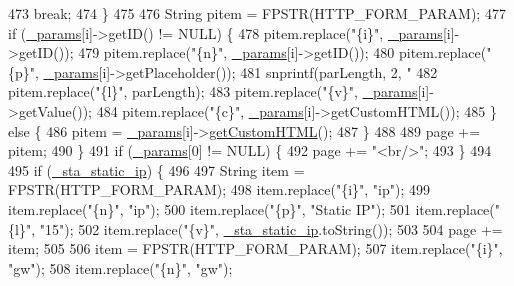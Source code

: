\begin{DoxyCode}
473       \textcolor{keywordflow}{break};
474     \}
475 
476     String pitem = FPSTR(HTTP\_FORM\_PARAM);
477     \textcolor{keywordflow}{if} (\hyperlink{class_wi_fi_manager_a355ce9bbaab94baffd1c83de9b166fea}{\_params}[i]->getID() != NULL) \{
478       pitem.replace(\textcolor{stringliteral}{"\{i\}"}, \hyperlink{class_wi_fi_manager_a355ce9bbaab94baffd1c83de9b166fea}{\_params}[i]->getID());
479       pitem.replace(\textcolor{stringliteral}{"\{n\}"}, \hyperlink{class_wi_fi_manager_a355ce9bbaab94baffd1c83de9b166fea}{\_params}[i]->getID());
480       pitem.replace(\textcolor{stringliteral}{"\{p\}"}, \hyperlink{class_wi_fi_manager_a355ce9bbaab94baffd1c83de9b166fea}{\_params}[i]->getPlaceholder());
481       snprintf(parLength, 2, \textcolor{stringliteral}{"%
482       pitem.replace(\textcolor{stringliteral}{"\{l\}"}, parLength);
483       pitem.replace(\textcolor{stringliteral}{"\{v\}"}, \hyperlink{class_wi_fi_manager_a355ce9bbaab94baffd1c83de9b166fea}{\_params}[i]->getValue());
484       pitem.replace(\textcolor{stringliteral}{"\{c\}"}, \hyperlink{class_wi_fi_manager_a355ce9bbaab94baffd1c83de9b166fea}{\_params}[i]->getCustomHTML());
485     \} \textcolor{keywordflow}{else} \{
486       pitem = \hyperlink{class_wi_fi_manager_a355ce9bbaab94baffd1c83de9b166fea}{\_params}[i]->\hyperlink{class_wi_fi_manager_parameter_a596273c189eb40107500cee3ad31b13b}{getCustomHTML}();
487     \}
488 
489     page += pitem;
490   \}
491   \textcolor{keywordflow}{if} (\hyperlink{class_wi_fi_manager_a355ce9bbaab94baffd1c83de9b166fea}{\_params}[0] != NULL) \{
492     page += \textcolor{stringliteral}{"<br/>"};
493   \}
494 
495   \textcolor{keywordflow}{if} (\hyperlink{class_wi_fi_manager_ad90d356096742a43b4540117b92faff0}{\_sta\_static\_ip}) \{
496 
497     String item = FPSTR(HTTP\_FORM\_PARAM);
498     item.replace(\textcolor{stringliteral}{"\{i\}"}, \textcolor{stringliteral}{"ip"});
499     item.replace(\textcolor{stringliteral}{"\{n\}"}, \textcolor{stringliteral}{"ip"});
500     item.replace(\textcolor{stringliteral}{"\{p\}"}, \textcolor{stringliteral}{"Static IP"});
501     item.replace(\textcolor{stringliteral}{"\{l\}"}, \textcolor{stringliteral}{"15"});
502     item.replace(\textcolor{stringliteral}{"\{v\}"}, \hyperlink{class_wi_fi_manager_ad90d356096742a43b4540117b92faff0}{\_sta\_static\_ip}.toString());
503 
504     page += item;
505 
506     item = FPSTR(HTTP\_FORM\_PARAM);
507     item.replace(\textcolor{stringliteral}{"\{i\}"}, \textcolor{stringliteral}{"gw"});
508     item.replace(\textcolor{stringliteral}{"\{n\}"}, \textcolor{stringliteral}{"gw"});
}
\end{DoxyCode}
